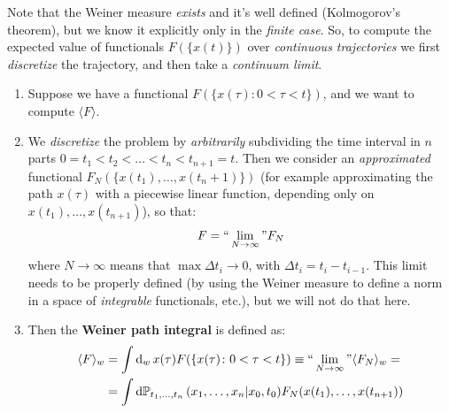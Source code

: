 \documentclass[../template.tex]{subfiles}
\begin{document}
Note that the Weiner measure \textit{exists} and it's well defined (Kolmogorov's theorem), but we know it explicitly only in the \textit{finite case}. So, to compute the expected value of functionals $F(\{x(t)\})$ over \textit{continuous trajectories} we first \textit{discretize} the trajectory, and then take a \textit{continuum limit}. 
\begin{enumerate}
    \item Suppose we have a functional $F(\{x(\tau)\colon 0< \tau < t\})$, and we want to compute $\langle F \rangle$.
    \item We \textit{discretize} the problem by \textit{arbitrarily}  subdividing the time interval in $n$ parts $0 = t_1 < t_2 < \dots < t_n < t_{n+1} = t$. Then we consider an \textit{approximated} functional $F_N(\{x(t_1), \dots, x(t_n+1)\})$ (for example approximating the path $x(\tau)$ with a piecewise linear function, depending only on $x(t_1),\dots,x(t_{n+1})$), so that:
    \begin{align*}
        F = ``\lim_{N \to \infty}" F_N
    \end{align*}
    where $N \to\infty $ means that $\max \Delta t_i \to 0$, with $\Delta t_i = t_i - t_{i-1}$. This limit needs to be properly defined (by using the Weiner measure to define a norm in a space of \textit{integrable} functionals, etc.), but we will not do that here.
    \item Then the \textbf{Weiner path integral} is defined as:
    \begin{align*}
        \langle F \rangle_w &= \int \dd{_w}x(\tau) F(\{x(\tau)\colon 0 < \tau< t \}) \equiv ``\lim_{N \to \infty}" \langle F_N \rangle_w =\\
        &= \int \dd{\mathbb{P}}_{t_1,\dots,t_n}(x_1,\dots,x_n|x_0,t_0) F_N(x(t_1), \dots, x(t_{n+1}))
    \end{align*} 
\end{enumerate}


      
\end{document}
